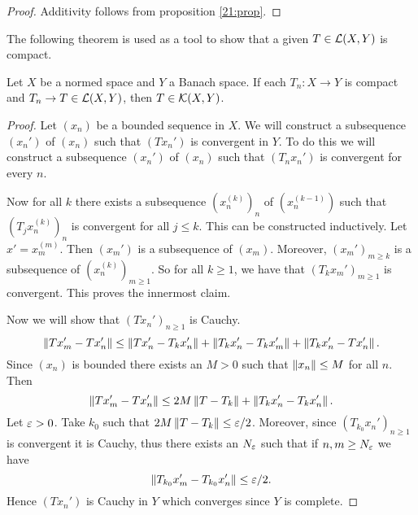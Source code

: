 \begin{proof}
  Additivity follows from proposition \ref{21:prop}.
\end{proof}

The following theorem is used as a tool to show that a given $T \in \mathcal{L}(X,Y)$ is compact.

\begin{thm}
  Let $X$ be a normed space and $Y$ a Banach space.
  If each $T_n: X \to Y$ is compact and $T_n \to T \in \mathcal{L}(X,Y)$, then $T \in \mathcal{K}(X,Y)$.
\end{thm}

\begin{proof}
  Let $(x_n)$ be a bounded sequence in $X$.
  We will construct a subsequence $(x_n')$ of $(x_n)$ such that $(Tx_n')$ is convergent in $Y$.
  To do this we will construct a subsequence $(x_n')$ of $(x_n)$ such that $(T_nx_n')$ is convergent for every $n$.

  Now for all $k$ there exists a subsequence $(x_n^{(k)})_n$ of $(x_n^{(k-1)})$ such that $(T_jx_n^{(k)})_n$ is convergent for all $j \leq k$.
  This can be constructed inductively.
  Let $x'=x_m^{(m)}$.
  Then $(x_m')$ is a subsequence of $(x_m)$.
  Moreover, $(x_m')_{m \geq k}$ is a subsequence of $(x_n^{(k)})_{m \geq 1}$.
  So for all $k \geq 1$, we have that $(T_kx_m')_{m \geq 1}$ is convergent.
  This proves the innermost claim.

  Now we will show that $(Tx_n')_{n \geq 1}$ is Cauchy.
  \[ \left\lVert Tx_m'-Tx_n' \right\rVert \leq \left\lVert Tx_n'-T_kx_n' \right\rVert + \left\lVert T_kx_n'-T_kx_m' \right\rVert + \left\lVert T_kx_n'-Tx_n' \right\rVert. \]
  Since $(x_n)$ is bounded there exists an $M>0$ such that $\left\lVert x_n \right\rVert\leq M$ for all $n$.
  Then
  \[ \left\lVert Tx_m'-Tx_n' \right\rVert \leq 2M\left\lVert T-T_k \right\rVert + \left\lVert T_kx_n'-T_kx_n' \right\rVert. \]
  Let $\varepsilon>0$.
  Take $k_0$ such that $2M\left\lVert T-T_k \right\rVert \leq \varepsilon/2$.
  Moreover, since $(T_{k_0}x_n')_{n \geq 1}$ is convergent it is Cauchy, thus there exists an $N_\varepsilon$ such that if $n,m \geq N_\varepsilon$ we have
  \[ \left\lVert T_{k_0}x_m' - T_{k_0}x_n' \right\rVert \leq \varepsilon/2. \]
  Hence $(Tx_n')$ is Cauchy in $Y$ which converges since $Y$ is complete.
\end{proof}

